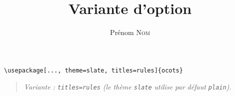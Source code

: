 \documentclass[11pt]{ocots-book}
\title{Variante d'option}
\author{Prénom \textsc{Nom}}
\newcommand{\ocotsvariantnote}[1]{\begin{quote}\itshape Variante : #1\end{quote}}
\begin{document}
\maketitle

\begin{lstlisting}
\usepackage[..., theme=slate, titles=rules]{ocots}
\end{lstlisting}
\ocotsvariantnote{\texttt{titles=rules} (le th\`eme \texttt{slate} utilise par d\'efaut \texttt{plain}).}

\end{document}
